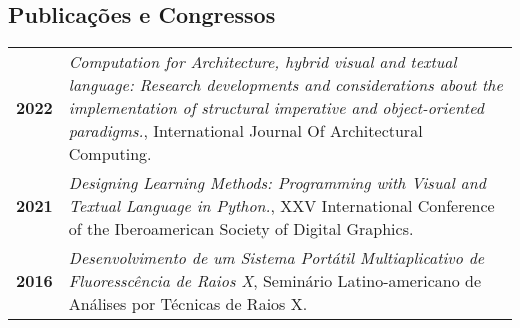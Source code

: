 \documentclass[darkhipster]{simplehipstercv}
\begin{document}
\begin{paracol}{2}
\begin{minipage}[t]{0.33\textwidth}
\section*{Publicações e Congressos}
\begin{tabular}{>{\footnotesize\bfseries}r | >{\footnotesize}p{}}
        2022 & \emph{Computation for Architecture, hybrid visual and textual language: Research developments and considerations about the implementation of structural imperative and object-oriented paradigms.}, International Journal Of Architectural Computing. \\
        2021 & \emph{Designing Learning Methods: Programming with Visual and Textual Language in Python.}, XXV International Conference of the Iberoamerican Society of Digital Graphics. \\
        2016 & \emph{Desenvolvimento de um Sistema Portátil Multiaplicativo de Fluoresscência de Raios X}, Seminário Latino-americano de Análises por Técnicas de Raios X. \\

\end{tabular}

\end{minipage}\hfill



\end{paracol}
\end{document}
